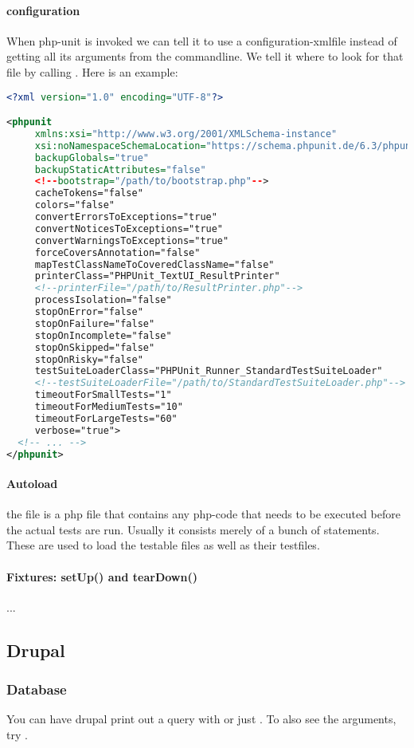 \paragraph{configuration} When php-unit is invoked we can tell it to use a configuration-xmlfile instead of getting all its arguments from the commandline. We tell it where to look for that file by calling . Here is an example: 

\begin{lstlisting}[language=xml]
<?xml version="1.0" encoding="UTF-8"?>

<phpunit
     xmlns:xsi="http://www.w3.org/2001/XMLSchema-instance"
     xsi:noNamespaceSchemaLocation="https://schema.phpunit.de/6.3/phpunit.xsd"
     backupGlobals="true"
     backupStaticAttributes="false"
     <!--bootstrap="/path/to/bootstrap.php"-->
     cacheTokens="false"
     colors="false"
     convertErrorsToExceptions="true"
     convertNoticesToExceptions="true"
     convertWarningsToExceptions="true"
     forceCoversAnnotation="false"
     mapTestClassNameToCoveredClassName="false"
     printerClass="PHPUnit_TextUI_ResultPrinter"
     <!--printerFile="/path/to/ResultPrinter.php"-->
     processIsolation="false"
     stopOnError="false"
     stopOnFailure="false"
     stopOnIncomplete="false"
     stopOnSkipped="false"
     stopOnRisky="false"
     testSuiteLoaderClass="PHPUnit_Runner_StandardTestSuiteLoader"
     <!--testSuiteLoaderFile="/path/to/StandardTestSuiteLoader.php"-->
     timeoutForSmallTests="1"
     timeoutForMediumTests="10"
     timeoutForLargeTests="60"
     verbose="true">
  <!-- ... -->
</phpunit>
\end{lstlisting}

\paragraph{Autoload} the file  is a php file that contains any php-code that needs to be executed before the actual tests are run. Usually it consists merely of a bunch of  statements. These are used to load the testable files as well as their testfiles. 

\paragraph{Fixtures: setUp() and tearDown()} ...





\subsection{Drupal}

\subsubsection{Database}

You can have drupal print out a query with  or just . To also see the arguments, try .



